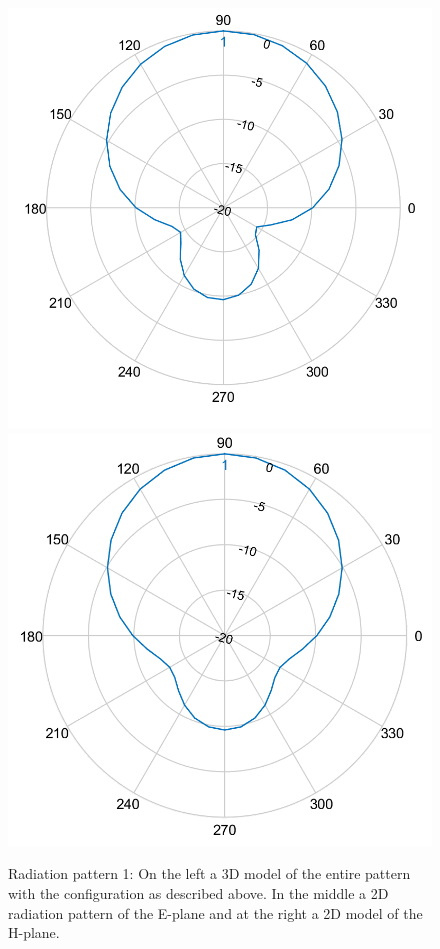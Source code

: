 \documentclass[twocolumn]{phdsymp} %
\begin{document}
\begin{figure}[!htb]
  \includegraphics[width=\linewidth]{pattern2/ep.png} 
\endminipage\hfill
{}%
  \includegraphics[width=\linewidth]{pattern2/hp.png}
\endminipage
  \caption{Radiation pattern 1: On the left a 3D model of the entire pattern with the configuration as described above. In the middle a 2D radiation pattern of the E-plane and at the right a 2D model of the H-plane.}
\label{fig:radpattern}
\end{figure}
\end{document}
